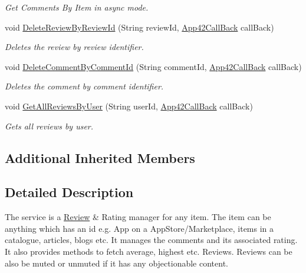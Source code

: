 \begin{DoxyCompactItemize}
\begin{DoxyCompactList}\small\item\em Get Comments By Item in async mode. \end{DoxyCompactList}\item 
void \hyperlink{classcom_1_1shephertz_1_1app42_1_1paas_1_1sdk_1_1csharp_1_1review_1_1_review_service_afafaad7354e3c4b008afdb41b31079bf}{Delete\+Review\+By\+Review\+Id} (String review\+Id, \hyperlink{interfacecom_1_1shephertz_1_1app42_1_1paas_1_1sdk_1_1csharp_1_1_app42_call_back}{App42\+Call\+Back} call\+Back)
\begin{DoxyCompactList}\small\item\em Deletes the review by review identifier. \end{DoxyCompactList}\item 
void \hyperlink{classcom_1_1shephertz_1_1app42_1_1paas_1_1sdk_1_1csharp_1_1review_1_1_review_service_a1f7259693e568ccc70d2496da05ed79f}{Delete\+Comment\+By\+Comment\+Id} (String comment\+Id, \hyperlink{interfacecom_1_1shephertz_1_1app42_1_1paas_1_1sdk_1_1csharp_1_1_app42_call_back}{App42\+Call\+Back} call\+Back)
\begin{DoxyCompactList}\small\item\em Deletes the comment by comment identifier. \end{DoxyCompactList}\item 
void \hyperlink{classcom_1_1shephertz_1_1app42_1_1paas_1_1sdk_1_1csharp_1_1review_1_1_review_service_ad165df7792fe2592f2aff301d437a80b}{Get\+All\+Reviews\+By\+User} (String user\+Id, \hyperlink{interfacecom_1_1shephertz_1_1app42_1_1paas_1_1sdk_1_1csharp_1_1_app42_call_back}{App42\+Call\+Back} call\+Back)
\begin{DoxyCompactList}\small\item\em Gets all reviews by user. \end{DoxyCompactList}\end{DoxyCompactItemize}
\subsection*{Additional Inherited Members}


\subsection{Detailed Description}
The service is a \hyperlink{classcom_1_1shephertz_1_1app42_1_1paas_1_1sdk_1_1csharp_1_1review_1_1_review}{Review} \& Rating manager for any item. The item can be anything which has an id e.\+g. App on a App\+Store/\+Marketplace, items in a catalogue, articles, blogs etc. It manages the comments and its associated rating. It also provides methods to fetch average, highest etc. Reviews. Reviews can be also be muted or unmuted if it has any objectionable content. 

